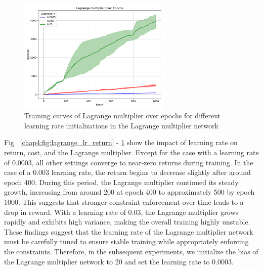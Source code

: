 \begin{figure}[h]
  \centering
  \includegraphics[width=0.65\textwidth]{imgs/chap4/lagrange_lr/lagrange.pdf}
  \caption{Training curves of Lagrange multiplier over epochs for different learning rate initializations in the Lagrange multiplier network}
  \label{chap4:fig:lagrange_lr_lagrange}
\end{figure}

Fig ~\ref{chap4:fig:lagrange_lr_return} - \ref{chap4:fig:lagrange_lr_lagrange} show the impact of learning rate on return, cost, and the Lagrange multiplier.
Except for the case with a learning rate of 0.0003, all other settings converge to near-zero returns during training.
In the case of a 0.003 learning rate, the return begins to decrease slightly after around epoch 400. During this period, the Lagrange multiplier continued its steady growth, increasing from around 200 at epoch 400 to approximately 500 by epoch 1000.
This suggests that stronger constraint enforcement over time leads to a drop in reward.
With a learning rate of 0.03, the Lagrange multiplier grows rapidly and exhibits high variance, making the overall training highly unstable.
These findings suggest that the learning rate of the Lagrange multiplier network must be carefully tuned to ensure stable training while appropriately enforcing the constraints.
Therefore, in the subsequent experiments, we initialize the bias of the Lagrange multiplier network to 20 and set the learning rate to 0.0003.

\clearpage

